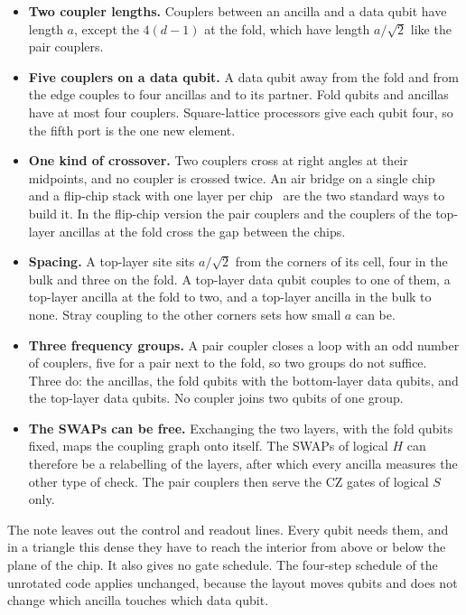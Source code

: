 \documentclass[11pt,a4paper]{article}
\begin{document}
\begin{itemize}
\item \textbf{Two coupler lengths.} Couplers between an ancilla and a data qubit have length
$a$, except the $4(d-1)$ at the fold, which have length $a/\sqrt2$ like the pair couplers.
\item \textbf{Five couplers on a data qubit.} A data qubit away from the fold and from the edge
couples to four ancillas and to its partner. Fold qubits and ancillas have at most four
couplers. Square-lattice processors give each qubit four, so the fifth port is the one new
element.
\item \textbf{One kind of crossover.} Two couplers cross at right angles at their midpoints, and
no coupler is crossed twice. An air bridge on a single chip~\cite{Chen2014} and a flip-chip
stack with one layer per chip~\cite{Rosenberg2017,Foxen2018} are the two standard ways to build
it. In the flip-chip version the pair couplers and the couplers of the top-layer ancillas at
the fold cross the gap between the chips.
\item \textbf{Spacing.} A top-layer site sits $a/\sqrt2$ from the corners of its cell, four in
the bulk and three on the fold. A top-layer data qubit couples to one of them, a top-layer
ancilla at the fold to two, and a top-layer ancilla in the bulk to none. Stray coupling to the other corners sets how small $a$
can be.
\item \textbf{Three frequency groups.} A pair coupler closes a loop with an odd number of
couplers, five for a pair next to the fold, so two groups do not suffice. Three do: the ancillas,
the fold qubits with the bottom-layer data qubits, and the top-layer data qubits. No coupler
joins two qubits of one group.
\item \textbf{The SWAPs can be free.} Exchanging the two layers, with the fold qubits fixed,
maps the coupling graph onto itself. The SWAPs of logical $H$ can therefore be a relabelling of
the layers, after which every ancilla measures the other type of check. The pair couplers then
serve the CZ gates of logical $S$ only.
\end{itemize}

The note leaves out the control and readout lines. Every qubit needs them, and in a triangle
this dense they have to reach the interior from above or below the plane of the chip. It also gives no gate
schedule. The four-step schedule of the unrotated code applies unchanged, because the layout
moves qubits and does not change which ancilla touches which data qubit.
\end{document}
